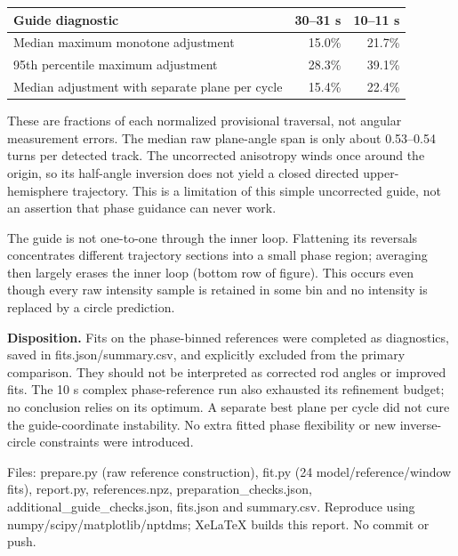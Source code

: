 \documentclass[10pt,a4paper]{article}
\begin{document}
\begin{tabular}{lrr}\toprule
Guide diagnostic & 30--31 s & 10--11 s\\\midrule
Median maximum monotone adjustment & 15.0\% & 21.7\%\\
95th percentile maximum adjustment & 28.3\% & 39.1\%\\
Median adjustment with separate plane per cycle & 15.4\% & 22.4\%\\\bottomrule
\end{tabular}

These are fractions of each normalized provisional traversal, not angular measurement errors. The median raw plane-angle span is only about 0.53--0.54 turns per detected track. The uncorrected anisotropy winds once around the origin, so its half-angle inversion does not yield a closed directed upper-hemisphere trajectory. This is a limitation of this simple uncorrected guide, not an assertion that phase guidance can never work.

The guide is not one-to-one through the inner loop. Flattening its reversals concentrates different trajectory sections into a small phase region; averaging then largely erases the inner loop (bottom row of figure). This occurs even though every raw intensity sample is retained in some bin and no intensity is replaced by a circle prediction.

\textbf{Disposition.} Fits on the phase-binned references were completed as diagnostics, saved in fits.json/summary.csv, and explicitly excluded from the primary comparison. They should not be interpreted as corrected rod angles or improved fits. The 10 s complex phase-reference run also exhausted its refinement budget; no conclusion relies on its optimum. A separate best plane per cycle did not cure the guide-coordinate instability. No extra fitted phase flexibility or new inverse-circle constraints were introduced.

Files: prepare.py (raw reference construction), fit.py (24 model/reference/window fits), report.py, references.npz, preparation\_checks.json, additional\_guide\_checks.json, fits.json and summary.csv. Reproduce using numpy/scipy/matplotlib/nptdms; XeLaTeX builds this report. No commit or push.
\end{document}
